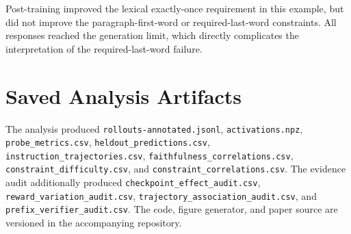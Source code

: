 \documentclass[manuscript,screen,nonacm]{acmart}
\begin{document}
Post-training improved the lexical exactly-once requirement in this example,
but did not improve the paragraph-first-word or required-last-word constraints.
All responses reached the generation limit, which directly complicates the
interpretation of the required-last-word failure.

\section{Saved Analysis Artifacts}

The analysis produced \texttt{rollouts-annotated.jsonl},
\texttt{activations.npz}, \texttt{probe\_metrics.csv},
\texttt{heldout\_predictions.csv},
\texttt{instruction\_trajectories.csv},
\texttt{faithfulness\_correlations.csv},
\texttt{constraint\_difficulty.csv}, and
\texttt{constraint\_correlations.csv}. The evidence audit additionally produced
\texttt{checkpoint\_effect\_audit.csv},
\texttt{reward\_variation\_audit.csv},
\texttt{trajectory\_association\_audit.csv}, and
\texttt{prefix\_verifier\_audit.csv}. The code, figure generator, and paper
source are versioned in the accompanying repository.
\end{document}
